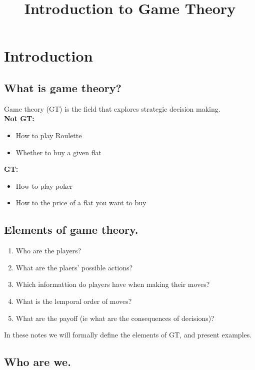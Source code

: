 \documentclass{article}
\title{Introduction to Game Theory}
\date{}
\begin{document}
\maketitle

\section{Introduction}

\subsection{What is game theory?}
Game theory (GT) is the field that explores strategic decision making. \\

\textbf{Not GT:}
\begin{itemize}
    \item How to play Roulette
    \item Whether to buy a given flat
\end{itemize}

\textbf{GT:}
\begin{itemize}
    \item How to play poker
    \item How to the price of a flat you want to buy
\end{itemize}

\subsection{Elements of game theory.}

\begin{enumerate}
    \item Who are the players?
    \item What are the plaers' possible actions?
    \item Which informattion do players have when making their moves?
    \item What is the lemporal order of moves?
    \item What are the payoff (ie what are the consequences of decisions)?
\end{enumerate}

In these notes we will formally define the elements of GT, and present examples.

\subsection{Who are we.}
\end{document}

